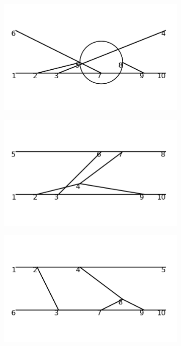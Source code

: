 \documentclass[11pt,a4paper,twoside,pdf]{article}
\numberwithin{equation}{section}
\begin{document}
\begin{figure}[h!]
\begin{subfigure}[t]{0.16\textwidth}
    \end{subfigure}
    \hfill
    \begin{subfigure}[t]{0.16\textwidth}
        \centering
        \includegraphics[width=\textwidth]{plots/order6_2to2/6.png}
    \end{subfigure}
    \hfill
    \begin{subfigure}[t]{0.16\textwidth}
        \centering
        \includegraphics[width=\textwidth]{plots/order6_2to2/7.png}
    \end{subfigure}
    \hfill
    \begin{subfigure}[t]{0.16\textwidth}
        \centering
        \includegraphics[width=\textwidth]{plots/order6_2to2/8.png}

\end{subfigure}
\end{figure}
\end{document}
